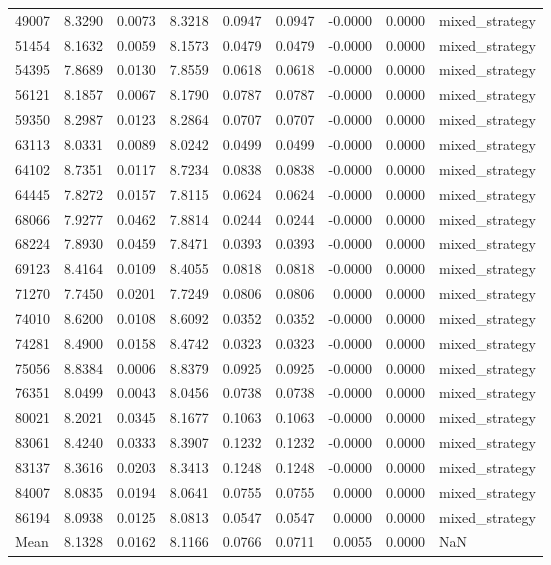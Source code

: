 \begin{tabular}{lrrrrrrrl}
49007 & 8.3290 & 0.0073 & 8.3218 & 0.0947 & 0.0947 & -0.0000 & 0.0000 & mixed_strategy \\
51454 & 8.1632 & 0.0059 & 8.1573 & 0.0479 & 0.0479 & -0.0000 & 0.0000 & mixed_strategy \\
54395 & 7.8689 & 0.0130 & 7.8559 & 0.0618 & 0.0618 & -0.0000 & 0.0000 & mixed_strategy \\
56121 & 8.1857 & 0.0067 & 8.1790 & 0.0787 & 0.0787 & -0.0000 & 0.0000 & mixed_strategy \\
59350 & 8.2987 & 0.0123 & 8.2864 & 0.0707 & 0.0707 & -0.0000 & 0.0000 & mixed_strategy \\
63113 & 8.0331 & 0.0089 & 8.0242 & 0.0499 & 0.0499 & -0.0000 & 0.0000 & mixed_strategy \\
64102 & 8.7351 & 0.0117 & 8.7234 & 0.0838 & 0.0838 & -0.0000 & 0.0000 & mixed_strategy \\
64445 & 7.8272 & 0.0157 & 7.8115 & 0.0624 & 0.0624 & -0.0000 & 0.0000 & mixed_strategy \\
68066 & 7.9277 & 0.0462 & 7.8814 & 0.0244 & 0.0244 & -0.0000 & 0.0000 & mixed_strategy \\
68224 & 7.8930 & 0.0459 & 7.8471 & 0.0393 & 0.0393 & -0.0000 & 0.0000 & mixed_strategy \\
69123 & 8.4164 & 0.0109 & 8.4055 & 0.0818 & 0.0818 & -0.0000 & 0.0000 & mixed_strategy \\
71270 & 7.7450 & 0.0201 & 7.7249 & 0.0806 & 0.0806 & 0.0000 & 0.0000 & mixed_strategy \\
74010 & 8.6200 & 0.0108 & 8.6092 & 0.0352 & 0.0352 & -0.0000 & 0.0000 & mixed_strategy \\
74281 & 8.4900 & 0.0158 & 8.4742 & 0.0323 & 0.0323 & -0.0000 & 0.0000 & mixed_strategy \\
75056 & 8.8384 & 0.0006 & 8.8379 & 0.0925 & 0.0925 & -0.0000 & 0.0000 & mixed_strategy \\
76351 & 8.0499 & 0.0043 & 8.0456 & 0.0738 & 0.0738 & -0.0000 & 0.0000 & mixed_strategy \\
80021 & 8.2021 & 0.0345 & 8.1677 & 0.1063 & 0.1063 & -0.0000 & 0.0000 & mixed_strategy \\
83061 & 8.4240 & 0.0333 & 8.3907 & 0.1232 & 0.1232 & -0.0000 & 0.0000 & mixed_strategy \\
83137 & 8.3616 & 0.0203 & 8.3413 & 0.1248 & 0.1248 & -0.0000 & 0.0000 & mixed_strategy \\
84007 & 8.0835 & 0.0194 & 8.0641 & 0.0755 & 0.0755 & 0.0000 & 0.0000 & mixed_strategy \\
86194 & 8.0938 & 0.0125 & 8.0813 & 0.0547 & 0.0547 & 0.0000 & 0.0000 & mixed_strategy \\
Mean & 8.1328 & 0.0162 & 8.1166 & 0.0766 & 0.0711 & 0.0055 & 0.0000 & NaN \\
\bottomrule
\end{tabular}
